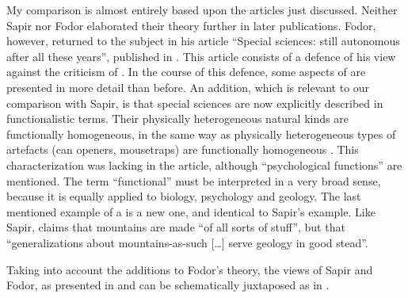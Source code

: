 \documentclass[output=paper]{langscibook}
\begin{document}
My comparison is almost entirely based upon the articles just discussed. Neither Sapir nor Fodor elaborated their theory further in later publications. Fodor, however, returned to the subject in his article ``Special sciences: still autonomous after all these years'', published in \citeyear{Fodor1997}. This article consists of a defence of his view against the criticism of \citet{Kim1992}. In the course of this defence, some aspects of  are presented in more detail than before. An addition, which is relevant to our comparison with Sapir, is that special sciences are now explicitly described in functionalistic terms. Their physically heterogeneous natural kinds are functionally homogeneous, in the same way as physically heterogeneous types of artefacts (can openers, mousetraps) are functionally homogeneous \citep[160]{Fodor1997}. This characterization was lacking in the \citeyear{Fodor1974} article, although ``psychological functions'' are mentioned. The term ``functional'' must be interpreted in a very broad sense, because it is equally applied to biology, psychology and geology. The last mentioned example of a  is a new one, and identical to Sapir's example. Like Sapir, \citet[160]{Fodor1997} claims that mountains are made ``of all sorts of stuff'', but that ``generalizations about mountains-as-such […] serve geology in good stead''.

Taking into account the \citeyear{Fodor1997} additions to Fodor's theory, the views of Sapir and Fodor, as presented in  and  can be schematically juxtaposed as in .

\begin{table}
\caption{Comparison of the views of Sapir and Fodor}
\label{tab:elffers:sciences}
\end{table}
\end{document}
